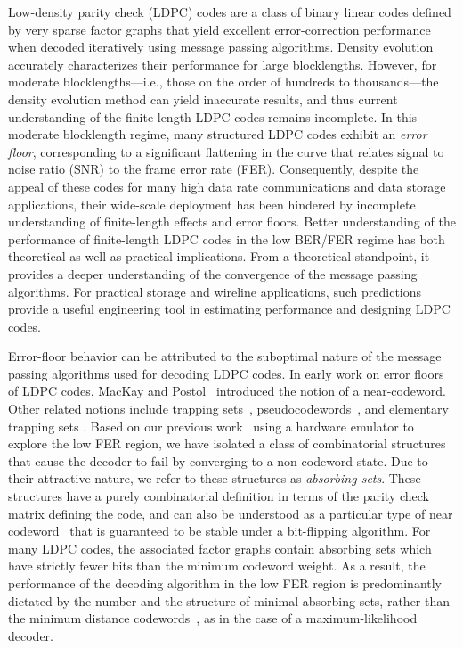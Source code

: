 Low-density parity check (LDPC) codes are a class of binary linear
codes defined by very sparse factor graphs that yield excellent
error-correction performance when decoded iteratively using message
passing algorithms. Density evolution~\cite{richurbanke} accurately
characterizes their performance for large blocklengths.  However, for
moderate blocklengths---i.e., those on the order of hundreds to
thousands---the density evolution method can yield inaccurate results,
and thus current understanding of the finite length LDPC codes remains
incomplete.  In this moderate blocklength regime, many structured LDPC
codes exhibit an \emph{error floor}, corresponding to a significant
flattening in the curve that relates signal to noise ratio (SNR) to
the frame error rate (FER).  Consequently, despite the appeal of these
codes for many high data rate communications and data storage
applications, their wide-scale deployment has been hindered by
incomplete understanding of finite-length effects and error floors.
Better understanding of the performance of finite-length LDPC codes in
the low BER/FER regime has both theoretical as well as practical
implications. From a theoretical standpoint, it provides a deeper
understanding of the convergence of the message passing
algorithms. For practical storage and wireline applications, such
predictions provide a useful engineering tool in estimating performance
and designing LDPC codes.

Error-floor behavior can be attributed to the suboptimal nature of the
message passing algorithms used for decoding LDPC codes.  In early
work on error floors of LDPC codes, MacKay and Postol~\cite{mackay}
introduced the notion of a near-codeword.  Other related notions
include trapping sets~\cite{richardson},
pseudocodewords~\cite{Frey98}, and elementary trapping sets
\cite{milenkov}.  Based on our previous work~\cite{zhang06} using a
hardware emulator to explore the low FER region, we have isolated a
class of combinatorial structures that cause the decoder to fail by
converging to a non-codeword state. Due to their attractive nature, we
refer to these structures as \textit{absorbing sets}.  These
structures have a purely combinatorial definition in terms of the
parity check matrix defining the code, and can also be understood as a
particular type of near codeword~\cite{mackay} that is guaranteed to
be stable under a bit-flipping algorithm. For many LDPC codes, the
associated factor graphs contain absorbing sets which have strictly
fewer bits than the minimum codeword weight. As a result, the
performance of the decoding algorithm in the low FER region is
predominantly dictated by the number and the structure of minimal
absorbing sets, rather than the minimum distance
codewords~\cite{icc-theory}, as in the case of a maximum-likelihood
decoder.


